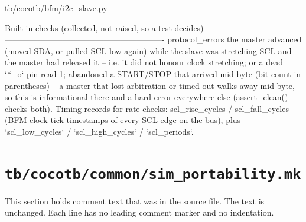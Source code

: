 \begin{relocated}{tb/cocotb/bfm/i2c_slave.py}
\begin{textblock}
Built-in checks (collected, not raised, so a test decides)
----------------------------------------------------------
protocol_errors  the master advanced (moved SDA, or pulled SCL low again) while the slave was
stretching SCL and the master had released it -- i.e. it did not honour clock
stretching; or a dead `*_o` pin read 1;
abandoned        a START/STOP that arrived mid-byte (bit count in parentheses) -- a master that
lost arbitration or timed out walks away mid-byte, so this is informational
there and a hard error everywhere else (assert_clean() checks both).
Timing records for rate checks: scl_rise_cycles / scl_fall_cycles (BFM clock-tick timestamps of
every SCL edge on the bus), plus `scl_low_cycles` / `scl_high_cycles` / `scl_periods`.
\end{textblock}

\end{relocated}

\section{\texttt{tb/cocotb/common/sim\_portability.mk}}\label{tm:suite:common-sim-portability-mk}

This section holds comment text that was in the source file. The text is unchanged. Each line has no leading comment marker and no indentation.

